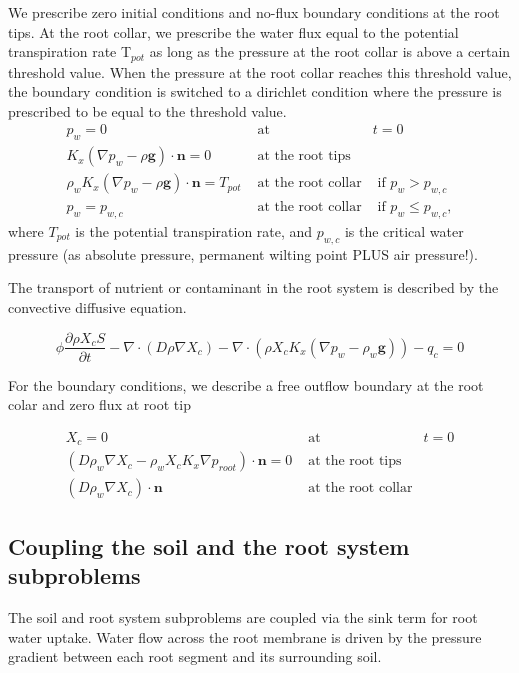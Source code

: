 We prescribe zero initial conditions and no-flux boundary conditions
at the root tips. At the root collar, we prescribe the water flux
equal to the potential transpiration rate T$_{pot}$ as long as the
pressure at the root collar is above a certain threshold value. When
the pressure at the root collar reaches this threshold value, the
boundary condition is switched to a dirichlet condition where the
pressure is prescribed to be equal to the threshold value. 
\begin{eqnarray}
p_{w}=0 & \text{ at } & t=0\\
K_{x}\left(\nabla p_{w}-\rho\boldsymbol{g}\right) \cdot \mathbf{n}=0 & \text{ at the root tips}\\
\rho_{w}K_{x}\left(\nabla p_{w}-\rho\boldsymbol{g}\right) \cdot \mathbf{n}=T_{pot} & \text{ at the root collar} & \text{ if }p_{w}>p_{w,c}\\
p_{w}=p_{w,c} & \text{ at the root collar} & \text{ if }p_{w}\le p_{w,c},
\end{eqnarray}
where $T_{pot}$ is the potential transpiration rate, and $p_{w,c}$
is the critical water pressure (as absolute pressure, permanent wilting
point PLUS air pressure!).

The transport of nutrient or contaminant in the root system is described
by the convective diffusive equation.

\[
\phi\frac{\partial\rho X_{c}S}{\partial t}-\nabla \cdot (D\rho\nabla X_{c})-\nabla \cdot (\rho X_{c}K_{x}\left(\nabla p_{w}-\rho_w\boldsymbol{g}\right))-q_{c}=0
\]

For the boundary conditions, we describe a free outflow boundary at the root colar and zero flux at root tip

\begin{eqnarray}
X_{c}=0 & \text{ at } & t=0\\
\left(D\rho_w\nabla X_{c} - \rho_w X_{c}K_{x}\nabla p_{root}\right) \cdot \mathbf{n}=0 & \text{ at the root tips}\\
\left(D\rho_w\nabla X_{c}\right)\cdot \mathbf{n} & \text{ at the root collar}
\end{eqnarray}


\subsection*{Coupling the soil and the root system subproblems}

The soil and root system subproblems are coupled via the sink term
for root water uptake. Water flow across the root membrane is driven
by the pressure gradient between each root segment and its surrounding
soil.

